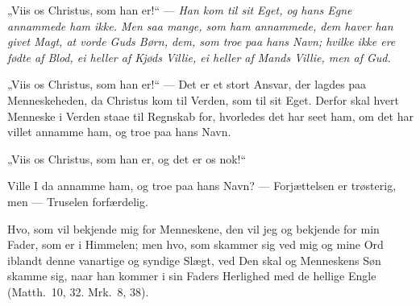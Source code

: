 \documentclass[12pt,a4paper]{book}
\begin{document}
„Viis os Christus, som han er!“ --- \emph{Han kom til sit Eget, og hans Egne
annammede ham ikke. Men saa mange, som ham annammede, dem haver han givet Magt,
at vorde Guds Børn, dem, som troe paa hans Navn; hvilke ikke ere fødte af Blod,
ei heller af Kjøds Villie, ei heller af Mands Villie, men af Gud.}

„Viis os Christus, som han er!“ --- Det er et stort Ansvar, der lagdes paa
Menneskeheden, da Christus kom til Verden, som til sit Eget. Derfor skal hvert
Menneske i Verden staae til Regnskab for, hvorledes det har seet ham, om det har
villet annamme ham, og troe paa hans Navn.

„Viis os Christus, som han er, og det er os nok!“

Ville I da annamme ham, og troe paa hans Navn? --- Forjættelsen er trøsterig, men
--- Truselen forfærdelig.

\begingroup\large
Hvo, som vil bekjende mig for Menneskene, den vil jeg og bekjende for min Fader,
som er i Himmelen; men hvo, som skammer sig ved mig og mine Ord iblandt denne
vanartige og syndige Slægt, ved Den skal og Menneskens Søn skamme sig, naar han
kommer i sin Faders Herlighed med de hellige Engle (Matth.\ 10, 32. Mrk.\ 8, 38).
\par\endgroup
\end{document}
